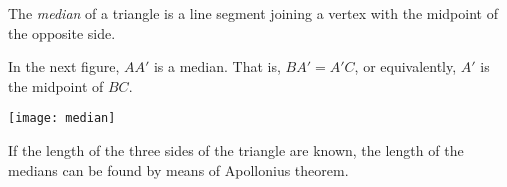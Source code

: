 \documentclass[12pt]{article}
\begin{document}
The \emph{median} of a triangle is a line segment joining a vertex with the midpoint of the opposite side.

In the next figure, $AA'$ is a median. That is, $BA'=A'C$, or equivalently, $A'$ is the midpoint of $BC$.

\begin{center}
\texttt{[image: median]}
\end{center}

If the length of the three sides of the triangle are known, the length of the medians can be found by means of Apollonius theorem.
\end{document}
